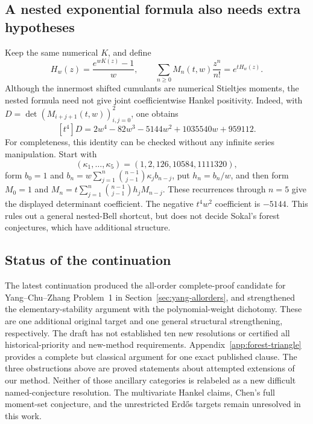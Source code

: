\documentclass[11pt,a4paper]{article}
\theoremstyle{definition}
\theoremstyle{remark}
\numberwithin{equation}{section}
\begin{document}
\subsection{A nested exponential formula also needs extra hypotheses}

Keep the same numerical $K$, and define
\[
 H_w(z)=\frac{e^{wK(z)}-1}{w},\qquad
 \sum_{n\ge0}M_n(t,w)\frac{z^n}{n!}=e^{tH_w(z)}.
\]
Although the innermost shifted cumulants are numerical Stieltjes
moments, the nested formula need not give joint coefficientwise Hankel
positivity. Indeed, with
$D=\det(M_{i+j+1}(t,w))_{i,j=0}^{2}$, one obtains
\[
 [t^4]D=2w^4-82w^3-5144w^2+1035540w+959112.
\]
For completeness, this identity can be checked without any infinite
series manipulation. Start with
\[
 (\kappa_1,\ldots,\kappa_5)=(1,2,126,10584,1111320),
\]
form $b_0=1$ and
$b_n=w\sum_{j=1}^{n}\binom{n-1}{j-1}\kappa_jb_{n-j}$,
put $h_n=b_n/w$, and then form
$M_0=1$ and
$M_n=t\sum_{j=1}^{n}\binom{n-1}{j-1}h_jM_{n-j}$.
These recurrences through $n=5$ give the displayed determinant
coefficient. The negative $t^4w^2$ coefficient is $-5144$.
This rules out a general nested-Bell shortcut, but does not decide
Sokal's forest conjectures, which have additional structure.

\subsection{Status of the continuation}

The latest continuation produced the all-order complete-proof candidate
for Yang--Chu--Zhang Problem~1 in Section~\ref{sec:yang-allorders},
and strengthened the elementary-stability argument with the
polynomial-weight dichotomy. These are one additional original target
and one general structural strengthening, respectively. The draft has
not established ten new resolutions or certified all historical-priority
and new-method requirements.
Appendix~\ref{app:forest-triangle} provides a complete but classical
argument for one exact published clause. The three obstructions above
are proved statements about attempted extensions of our method.
Neither of those ancillary categories is relabeled as a new difficult
named-conjecture resolution. The multivariate Hankel claims,
Chen's full moment-set conjecture, and the unrestricted Erd\H{o}s
targets remain unresolved in this work.
\end{document}
